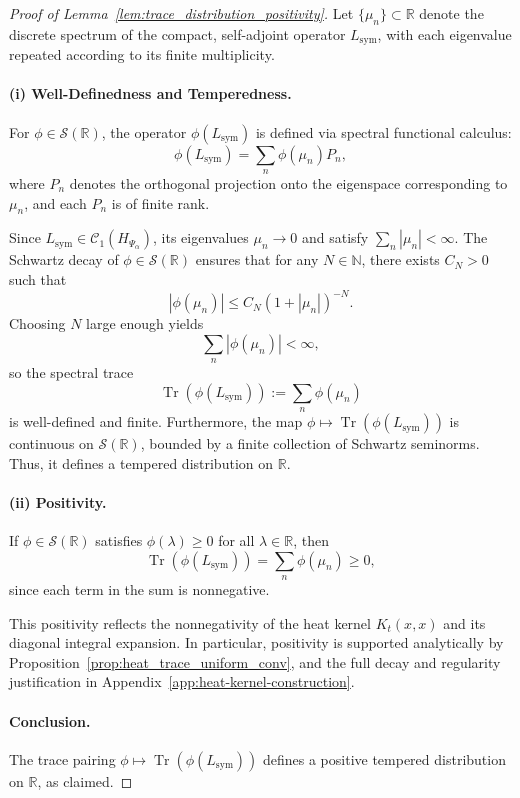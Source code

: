 \begin{proof}[Proof of Lemma~\ref{lem:trace_distribution_positivity}]
Let \( \{ \mu_n \} \subset \mathbb{R} \) denote the discrete spectrum of the compact, self-adjoint operator \( L_{\mathrm{sym}} \), with each eigenvalue repeated according to its finite multiplicity.

\paragraph{(i) Well-Definedness and Temperedness.}
For \( \phi \in \mathcal{S}(\mathbb{R}) \), the operator \( \phi(L_{\mathrm{sym}}) \) is defined via spectral functional calculus:
\[
\phi(L_{\mathrm{sym}}) = \sum_n \phi(\mu_n) P_n,
\]
where \( P_n \) denotes the orthogonal projection onto the eigenspace corresponding to \( \mu_n \), and each \( P_n \) is of finite rank.

Since \( L_{\mathrm{sym}} \in \mathcal{C}_1(H_{\Psi_\alpha}) \), its eigenvalues \( \mu_n \to 0 \) and satisfy \( \sum_n |\mu_n| < \infty \). The Schwartz decay of \( \phi \in \mathcal{S}(\mathbb{R}) \) ensures that for any \( N \in \mathbb{N} \), there exists \( C_N > 0 \) such that
\[
|\phi(\mu_n)| \le C_N (1 + |\mu_n|)^{-N}.
\]
Choosing \( N \) large enough yields
\[
\sum_n |\phi(\mu_n)| < \infty,
\]
so the spectral trace
\[
\operatorname{Tr}(\phi(L_{\mathrm{sym}})) := \sum_n \phi(\mu_n)
\]
is well-defined and finite. Furthermore, the map \( \phi \mapsto \operatorname{Tr}(\phi(L_{\mathrm{sym}})) \) is continuous on \( \mathcal{S}(\mathbb{R}) \), bounded by a finite collection of Schwartz seminorms. Thus, it defines a tempered distribution on \( \mathbb{R} \).

\paragraph{(ii) Positivity.}
If \( \phi \in \mathcal{S}(\mathbb{R}) \) satisfies \( \phi(\lambda) \ge 0 \) for all \( \lambda \in \mathbb{R} \), then
\[
\operatorname{Tr}(\phi(L_{\mathrm{sym}})) = \sum_n \phi(\mu_n) \ge 0,
\]
since each term in the sum is nonnegative.

This positivity reflects the nonnegativity of the heat kernel \( K_t(x, x) \) and its diagonal integral expansion. In particular, positivity is supported analytically by Proposition~\ref{prop:heat_trace_uniform_conv}, and the full decay and regularity justification in Appendix~\ref{app:heat-kernel-construction}.

\paragraph{Conclusion.}
The trace pairing \( \phi \mapsto \operatorname{Tr}(\phi(L_{\mathrm{sym}})) \) defines a positive tempered distribution on \( \mathbb{R} \), as claimed.
\end{proof}
